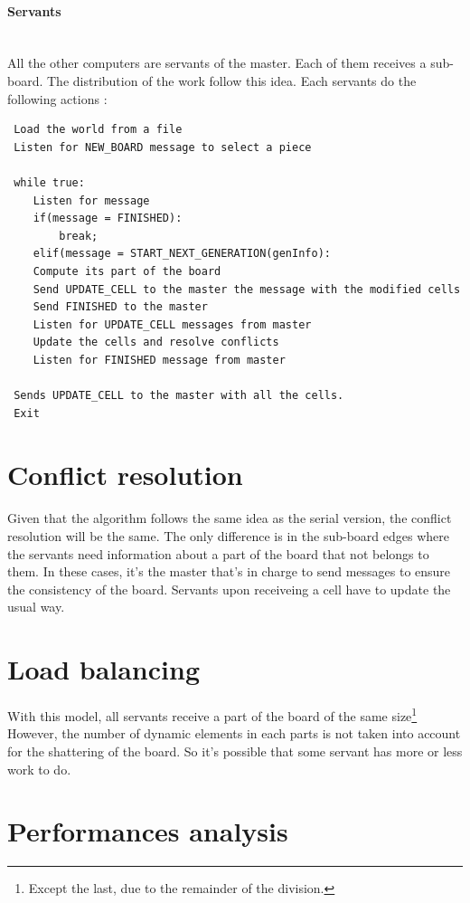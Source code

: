 \documentclass[a4paper,10pt]{article}
\begin{document}
\paragraph{Servants}
~\\

All the other computers are servants of the master. Each of them receives a sub-board. The distribution of the work follow this idea.
Each servants do the following actions :

\begin{lstlisting}
 Load the world from a file
 Listen for NEW_BOARD message to select a piece
 
 while true:
    Listen for message
    if(message = FINISHED):
		break;
    elif(message = START_NEXT_GENERATION(genInfo):
    Compute its part of the board
    Send UPDATE_CELL to the master the message with the modified cells
    Send FINISHED to the master
    Listen for UPDATE_CELL messages from master
    Update the cells and resolve conflicts
    Listen for FINISHED message from master
    
 Sends UPDATE_CELL to the master with all the cells.
 Exit
\end{lstlisting}

\section*{Conflict resolution}
Given that the algorithm follows the same idea as the serial version, the conflict resolution will be the same. 
The only difference is in the sub-board edges where the servants need information about a part of the board that not belongs to them.
In these cases, it's the master that's in charge to send messages to ensure the consistency of the board. Servants upon receiveing a cell have to update the usual way.
\section*{Load balancing}
With this model, all servants receive a part of the board of the same size\footnote{Except the last, due to the remainder of the division.}
However, the number of dynamic elements in each parts is not taken into account for the shattering of the board. So it's possible
that some servant has more or less work to do.
\section*{Performances analysis}
\end{document}
